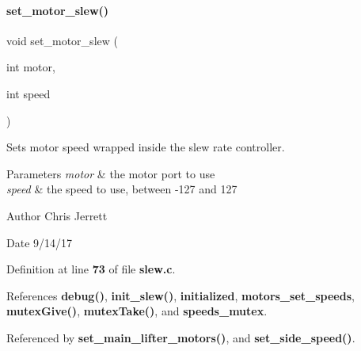 \paragraph{set\+\_\+motor\+\_\+slew()}
{\footnotesize\ttfamily void set\+\_\+motor\+\_\+slew (\begin{DoxyParamCaption}\item[{int}]{motor,  }\item[{int}]{speed }\end{DoxyParamCaption})}



Sets motor speed wrapped inside the slew rate controller. 


\begin{DoxyParams}{Parameters}
{\em motor} & the motor port to use \\
\hline
{\em speed} & the speed to use, between -\/127 and 127 \\
\hline
\end{DoxyParams}
\begin{DoxyAuthor}{Author}
Chris Jerrett 
\end{DoxyAuthor}
\begin{DoxyDate}{Date}
9/14/17 
\end{DoxyDate}


Definition at line \textbf{ 73} of file \textbf{ slew.\+c}.



References \textbf{ debug()}, \textbf{ init\+\_\+slew()}, \textbf{ initialized}, \textbf{ motors\+\_\+set\+\_\+speeds}, \textbf{ mutex\+Give()}, \textbf{ mutex\+Take()}, and \textbf{ speeds\+\_\+mutex}.



Referenced by \textbf{ set\+\_\+main\+\_\+lifter\+\_\+motors()}, and \textbf{ set\+\_\+side\+\_\+speed()}.


